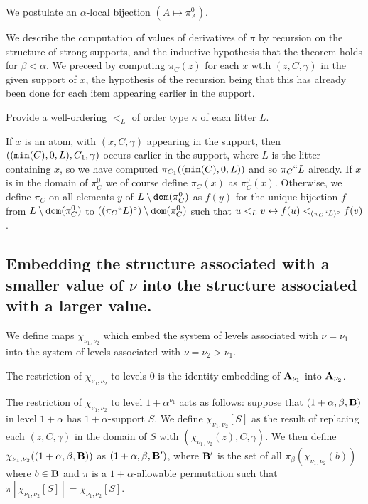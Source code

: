 \documentclass[12pt]{article}
\begin{document}
We postulate an $\alpha$-local bijection $(A \mapsto \pi^0_A)$.

We describe the computation of values of derivatives of $\pi$ by recursion on the structure of strong supports, and the inductive hypothesis that the theorem holds for $\beta<\alpha$.  We preceed by computing $\pi_C(z)$ for each $x$ wtih
$(z,C,\gamma)$ in the given support of $x$, the hypothesis of the recursion being that this has already been done for each item appearing earlier in the support.

Provide a well-ordering $<_L$ of order type $\kappa$ of each litter $L$.

If $x$ is an atom, with $(x,C,\gamma)$ appearing in the support, then $(({\tt min}(C),0,L),C_1,\gamma)$ occurs earlier in the support, where $L$ is the litter containing $x$, so we have computed $\pi_{C_1}(({\tt min}(C),0,L))$ and so $\pi_C``L$ already.
If $x$ is in the domain of $\pi^0_C$ we of course define $\pi_C(x)$ as $\pi^0_C(x)$.  Otherwise, we define $\pi_C$ on all elements $y$ of $L \setminus {\tt dom}(\pi^0_C)$ as $f(y)$ for the unique bijection $f$ from $L \setminus {\tt dom}(\pi^0_C)$ to
$((\pi_C``L)^\circ) \setminus {\tt dom}(\pi^0_C)$ such that $u <_L v \leftrightarrow f(u)<_{(\pi_C``L)^\circ} f(v)$.




\subsection{Embedding the structure associated with a smaller value of $\nu$ into the structure associated with a larger value.}

We define maps $\chi_{\nu_1,\nu_2}$ which embed the system of levels associated with $\nu=\nu_1$
into the system of levels associated with $\nu=\nu_2>\nu_1$.

The restriction of $\chi_{\nu_1,\nu_2}$ to levels 0 is the identity embedding of ${\bf A}_{\nu_1}$ into ${\bf A}_{\nu_2}$.

The restriction of $\chi_{\nu_1,\nu_2}$ to level $1+\alpha^{\nu_1}$ acts as follows:  suppose that \newline$(1+\alpha,\beta,{\bf B})$ in level $1+\alpha$ has $1+\alpha$-support $S$.  We define $\chi_{\nu_1,\nu_2}[S]$ as the result of replacing each $(z,C,\gamma)$ in the domain of $S$ with $(\chi_{\nu_1,\nu_2}(z),C,\gamma)$.  We then define $\chi_{\nu_1,\nu_2}((1+\alpha,\beta,{\bf B}))$ as $(1+\alpha,\beta,{\bf B}')$, where ${\bf B}'$ is the set of all $\pi_\beta(\chi_{\nu_1,\nu_2}(b))$ where $b \in {\bf B}$ and $\pi$ is a $1+\alpha$-allowable permutation such that $\pi[\chi_{\nu_1,\nu_2}[S]] = \chi_{\nu_1,\nu_2}[S]$.
\end{document}
